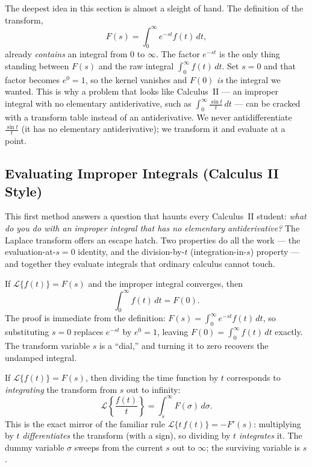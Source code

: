 \documentclass[11pt]{article}
\begin{document}
\begin{conceptbox}
The deepest idea in this section is almost a sleight of hand. The definition of the transform,
\[ F(s) = \int_0^\infty e^{-st} f(t)\,dt, \]
already \emph{contains} an integral from $0$ to $\infty$. The factor $e^{-st}$ is the only thing standing between $F(s)$ and the raw integral $\int_0^\infty f(t)\,dt$. \textcolor{accentorange}{Set $s=0$ and that factor becomes $e^{0}=1$}, so the kernel vanishes and $F(0)$ \emph{is} the integral we wanted. This is why a problem that looks like Calculus~II --- an improper integral with no elementary antiderivative, such as $\int_0^\infty \frac{\sin t}{t}\,dt$ --- can be cracked with a transform table instead of an antiderivative. We never antidifferentiate $\frac{\sin t}{t}$ (it has no elementary antiderivative); we transform it and evaluate at a point.
\end{conceptbox}

\subsection{Evaluating Improper Integrals (Calculus II Style)}

This first method answers a question that haunts every Calculus~II student: \emph{what do you do with an improper integral that has no elementary antiderivative?} The Laplace transform offers an escape hatch. Two properties do all the work --- the evaluation-at-$s=0$ identity, and the division-by-$t$ (integration-in-$s$) property --- and together they evaluate integrals that ordinary calculus cannot touch.

\begin{formulabox}[Property A --- Evaluation at $s=0$]
If $\mathcal{L}\{f(t)\} = F(s)$ and the improper integral converges, then
\[ \int_0^\infty f(t)\,dt = F(0). \]
The proof is immediate from the definition: $F(s) = \int_0^\infty e^{-st} f(t)\,dt$, so substituting $s=0$ replaces $e^{-st}$ by $e^{0}=1$, leaving $F(0) = \int_0^\infty f(t)\,dt$ exactly. The transform variable $s$ is a ``dial,'' and turning it to zero recovers the undamped integral.
\end{formulabox}

\begin{formulabox}
If $\mathcal{L}\{f(t)\} = F(s)$, then dividing the time function by $t$ corresponds to \emph{integrating} the transform from $s$ out to infinity:
\[ \mathcal{L}\!\left\{\frac{f(t)}{t}\right\} = \int_s^\infty F(\sigma)\,d\sigma. \]
This is the exact mirror of the familiar rule $\mathcal{L}\{t\,f(t)\} = -F'(s)$: multiplying by $t$ \emph{differentiates} the transform (with a sign), so dividing by $t$ \emph{integrates} it. The dummy variable $\sigma$ sweeps from the current $s$ out to $\infty$; the surviving variable is $s$.
\end{formulabox}
\end{document}
